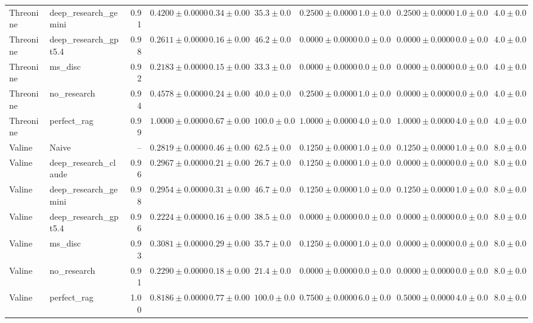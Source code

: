 \begin{table}[htbp]
\begin{tabular}{llrrrrrrrrr}
Threonine & deep_research_gemini & 0.91 & $0.4200 \pm 0.0000$ & $0.34 \pm 0.00$ & $35.3 \pm 0.0$ & $0.2500 \pm 0.0000$ & $1.0 \pm 0.0$ & $0.2500 \pm 0.0000$ & $1.0 \pm 0.0$ & $4.0 \pm 0.0$ \\
Threonine & deep_research_gpt5.4 & 0.98 & $0.2611 \pm 0.0000$ & $0.16 \pm 0.00$ & $46.2 \pm 0.0$ & $0.0000 \pm 0.0000$ & $0.0 \pm 0.0$ & $0.0000 \pm 0.0000$ & $0.0 \pm 0.0$ & $4.0 \pm 0.0$ \\
Threonine & ms_disc & 0.92 & $0.2183 \pm 0.0000$ & $0.15 \pm 0.00$ & $33.3 \pm 0.0$ & $0.0000 \pm 0.0000$ & $0.0 \pm 0.0$ & $0.0000 \pm 0.0000$ & $0.0 \pm 0.0$ & $4.0 \pm 0.0$ \\
Threonine & no_research & 0.94 & $0.4578 \pm 0.0000$ & $0.24 \pm 0.00$ & $40.0 \pm 0.0$ & $0.2500 \pm 0.0000$ & $1.0 \pm 0.0$ & $0.0000 \pm 0.0000$ & $0.0 \pm 0.0$ & $4.0 \pm 0.0$ \\
Threonine & perfect_rag & 0.99 & \cellcolor{green!25}$1.0000 \pm 0.0000$ & $0.67 \pm 0.00$ & $100.0 \pm 0.0$ & $1.0000 \pm 0.0000$ & $4.0 \pm 0.0$ & $1.0000 \pm 0.0000$ & $4.0 \pm 0.0$ & $4.0 \pm 0.0$ \\
\midrule
Valine & Naive & -- & $0.2819 \pm 0.0000$ & $0.46 \pm 0.00$ & $62.5 \pm 0.0$ & $0.1250 \pm 0.0000$ & $1.0 \pm 0.0$ & $0.1250 \pm 0.0000$ & $1.0 \pm 0.0$ & $8.0 \pm 0.0$ \\
Valine & deep_research_claude & 0.96 & $0.2967 \pm 0.0000$ & $0.21 \pm 0.00$ & $26.7 \pm 0.0$ & $0.1250 \pm 0.0000$ & $1.0 \pm 0.0$ & $0.0000 \pm 0.0000$ & $0.0 \pm 0.0$ & $8.0 \pm 0.0$ \\
Valine & deep_research_gemini & 0.98 & $0.2954 \pm 0.0000$ & $0.31 \pm 0.00$ & $46.7 \pm 0.0$ & $0.1250 \pm 0.0000$ & $1.0 \pm 0.0$ & $0.1250 \pm 0.0000$ & $1.0 \pm 0.0$ & $8.0 \pm 0.0$ \\
Valine & deep_research_gpt5.4 & 0.96 & \cellcolor{red!25}$0.2224 \pm 0.0000$ & $0.16 \pm 0.00$ & $38.5 \pm 0.0$ & $0.0000 \pm 0.0000$ & $0.0 \pm 0.0$ & $0.0000 \pm 0.0000$ & $0.0 \pm 0.0$ & $8.0 \pm 0.0$ \\
Valine & ms_disc & 0.93 & $0.3081 \pm 0.0000$ & $0.29 \pm 0.00$ & $35.7 \pm 0.0$ & $0.1250 \pm 0.0000$ & $1.0 \pm 0.0$ & $0.0000 \pm 0.0000$ & $0.0 \pm 0.0$ & $8.0 \pm 0.0$ \\
Valine & no_research & 0.91 & $0.2290 \pm 0.0000$ & $0.18 \pm 0.00$ & $21.4 \pm 0.0$ & $0.0000 \pm 0.0000$ & $0.0 \pm 0.0$ & $0.0000 \pm 0.0000$ & $0.0 \pm 0.0$ & $8.0 \pm 0.0$ \\
Valine & perfect_rag & 1.00 & \cellcolor{green!25}$0.8186 \pm 0.0000$ & $0.77 \pm 0.00$ & $100.0 \pm 0.0$ & $0.7500 \pm 0.0000$ & $6.0 \pm 0.0$ & $0.5000 \pm 0.0000$ & $4.0 \pm 0.0$ & $8.0 \pm 0.0$ \\
\bottomrule
\end{tabular}
\end{table}